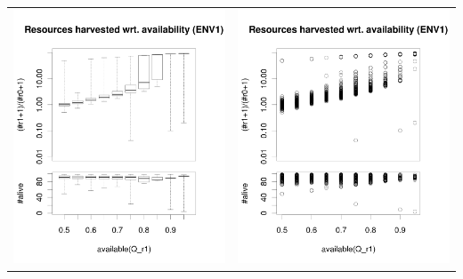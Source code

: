 \documentclass[a4paper,10pt]{article}
\begin{document}
\begin{table}[h!]
\begin{tabular}{cc}
\newline
\includegraphics[width=\imgSize]{images/5StaticEnv/ratioAndRep_staticEnv1LogY}&\includegraphics[width=\imgSize]{images/5StaticEnv/ratioAndRep_staticEnvPlot1LogY}\\

\end{tabular}
\end{table}
\end{document}
